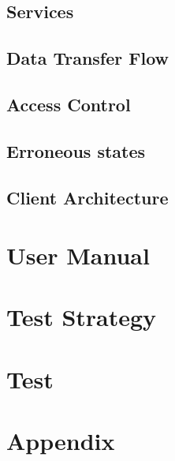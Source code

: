 \documentclass{report}
\begin{document}


\section{Services}


\section{Data Transfer Flow}



% 

\section{Access Control}



\section{Erroneous states}





\section{Client Architecture}




\chapter{User Manual}

\chapter{Test Strategy}


\chapter{Test}

\chapter{Appendix}
\end{document}
